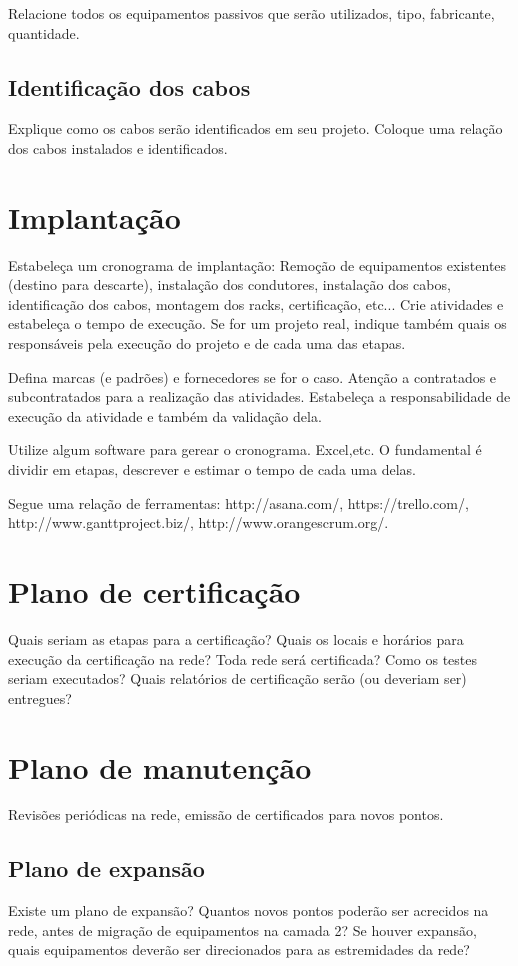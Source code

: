 \documentclass[	DIV=calc,%
							paper=a4,%
							fontsize=12pt,%
							onecolumn]{scrartcl}	 					%
\begin{document}
Relacione todos os equipamentos passivos que serão utilizados, tipo, fabricante, quantidade.

\subsection{Identificação dos cabos}
Explique como os cabos serão identificados em seu projeto. Coloque uma relação dos cabos instalados e identificados.

\section{Implantação}
Estabeleça um cronograma de implantação:
Remoção de equipamentos existentes (destino para descarte), instalação dos condutores, instalação dos cabos, 
identificação dos cabos, montagem dos racks, certificação, etc... Crie atividades e estabeleça o tempo de execução. Se for um projeto real, indique também quais os responsáveis pela execução do projeto e de cada uma das etapas.

Defina marcas (e padrões) e fornecedores se for o caso. Atenção a contratados e subcontratados para a realização das atividades. Estabeleça a responsabilidade de execução da atividade e também da validação dela.

Utilize algum software para gerear o cronograma. Excel,etc. O fundamental é dividir em etapas, descrever e estimar o tempo de cada uma delas.

Segue uma relação de ferramentas:
http://asana.com/, 
https://trello.com/, 
http://www.ganttproject.biz/, 
http://www.orangescrum.org/. 

\section{Plano de certificação}
Quais seriam as etapas para a certificação? 
Quais os locais e horários para execução da certificação na rede? Toda rede será certificada?
Como os testes seriam executados?
Quais relatórios de certificação serão (ou deveriam ser) entregues? 

\section{Plano de manutenção}

Revisões periódicas na rede, emissão de certificados para novos pontos.

\subsection{Plano de expansão}
Existe um plano de expansão? Quantos novos pontos poderão ser acrecidos na rede, antes de migração de equipamentos na camada 2? Se houver expansão, quais equipamentos deverão ser direcionados para as estremidades da rede? 
\end{document}
